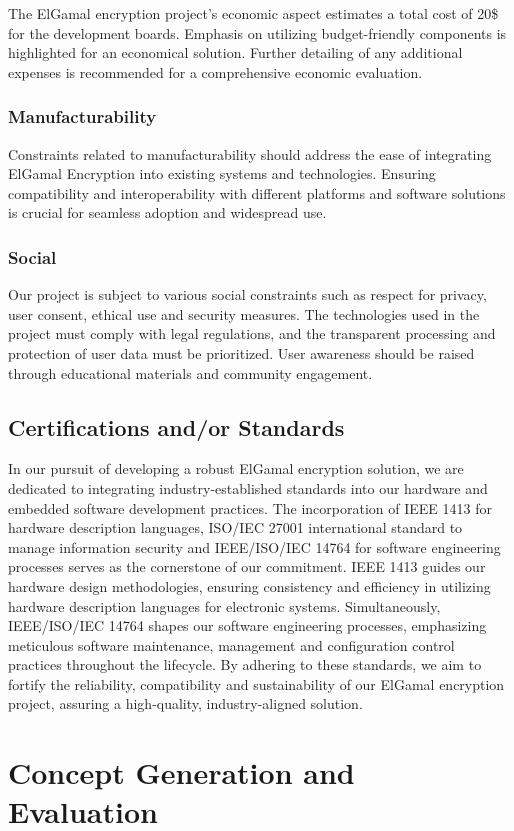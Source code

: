 \documentclass[12pt]{article}
\begin{document}
		The ElGamal encryption project's economic aspect estimates a total cost of 20\$ for the development boards. Emphasis on utilizing budget-friendly components is highlighted for an economical solution. Further detailing of any additional expenses is recommended for a comprehensive economic evaluation.
		\subsubsection{Manufacturability}
	Constraints related to manufacturability should address the ease of integrating ElGamal Encryption into existing systems and technologies. Ensuring compatibility and interoperability with different platforms and software solutions is crucial for seamless adoption and widespread use.
		\subsubsection{Social}
  		Our project is subject to various social constraints such as respect for privacy, user consent, ethical use and security measures. The technologies used in the project must comply with legal regulations, and the transparent processing and protection of user data must be prioritized. User awareness should be raised through educational materials and community engagement.
	\subsection{Certifications and/or Standards}
	In our pursuit of developing a robust ElGamal encryption solution, we are dedicated to integrating industry-established standards into our hardware and embedded software development practices. The incorporation of IEEE 1413 for hardware description languages, ISO/IEC 27001 international standard to manage information security and IEEE/ISO/IEC 14764 for software engineering processes serves as the cornerstone of our commitment. IEEE 1413 guides our hardware design methodologies, ensuring consistency and efficiency in utilizing hardware description languages for electronic systems. Simultaneously, IEEE/ISO/IEC 14764 shapes our software engineering processes, emphasizing meticulous software maintenance, management and configuration control practices throughout the lifecycle. By adhering to these standards, we aim to fortify the reliability, compatibility and sustainability of our ElGamal encryption project, assuring a high-quality, industry-aligned solution.
	\section{Concept Generation and Evaluation}
	
\end{document}
